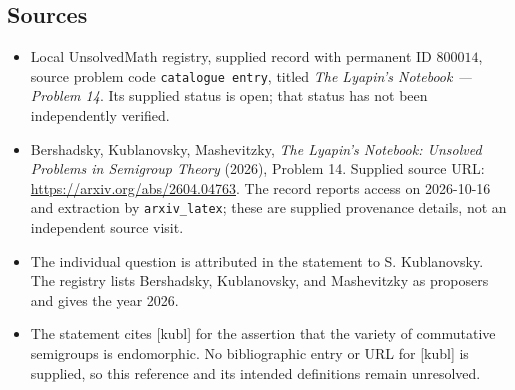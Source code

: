 \documentclass[11pt]{article}
\begin{document}
\subsection{Sources}
\begin{itemize}
\item Local UnsolvedMath registry, supplied record with permanent ID \(800014\), source problem code \texttt{catalogue entry}, titled \emph{The Lyapin's Notebook --- Problem 14}. Its supplied status is open; that status has not been independently verified.
\item Bershadsky, Kublanovsky, Mashevitzky, \emph{The Lyapin's Notebook: Unsolved Problems in Semigroup Theory} (2026), Problem 14. Supplied source URL: \url{https://arxiv.org/abs/2604.04763}. The record reports access on 2026-10-16 and extraction by \texttt{arxiv\_latex}; these are supplied provenance details, not an independent source visit.
\item The individual question is attributed in the statement to S. Kublanovsky. The registry lists Bershadsky, Kublanovsky, and Mashevitzky as proposers and gives the year 2026.
\item The statement cites [kubl] for the assertion that the variety of commutative semigroups is endomorphic. No bibliographic entry or URL for [kubl] is supplied, so this reference and its intended definitions remain unresolved.
\end{itemize}
\end{document}
